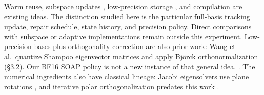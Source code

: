 Warm reuse, subspace updates \citep{oja1982simplified,yang1995projection},
low-precision storage \citep{micikevicius2017mixed,kalamkar2019study},
and compilation \citep{ansel2024pytorch} are
existing ideas. The distinction studied here is the particular full-basis
tracking update, repair schedule, state history, and precision policy. Direct comparisons
with subspace \citep{milligan2026reparametrizing} or adaptive
\citep{eschenhagen2025purifying,nam2026foam} implementations remain outside this
experiment. Low-precision bases plus orthogonality correction are also
prior work: Wang et al.~quantize Shampoo eigenvector matrices and apply
Björck orthonormalization (§3.2). Our BF16 SOAP policy is not a
new instance of that general idea.
\citep{wang2024fourbit}. The
numerical ingredients also have classical lineage: Jacobi eigensolvers
use plane rotations \citep{forsythe1960cyclic}, and iterative polar orthogonalization predates this
work \citep{bjorck1971iterative,higham2008functions,jordan2024muon}.
